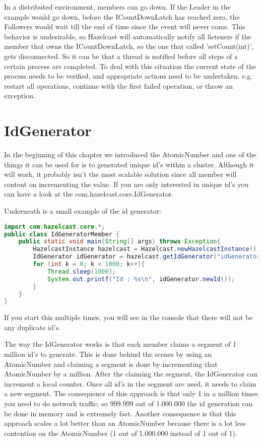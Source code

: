 In a distributed environment, members can go down. If the Leader in the example would go down, before the ICountDownLatch has reached zero, the Followers would wait till the end of time since the event will never come. This behavior is undesirable, so Hazelcast will automatically notify all listeners if the member that owns the ICountDownLatch, so the one that called 'setCount(int)', gets disconnected. So it can be that a thread is notified before all steps of a certain process are completed. To deal with this situation the current state of the process needs to be verified, and appropriate actions need to be undertaken. e.g. restart all operations, continue with the first failed operation, or throw an exception.

\section{IdGenerator}
In the beginning of this chapter we introduced the AtomicNumber and one of the things it can be used for is to generated unique id's within a cluster. Although it will work, it probably isn't the most scalable solution since all member will content on incrementing the value. If you are only interested in unique id's you can have a look at the com.hazelcast.core.IdGenerator.

Underneath is a small example of the id generator:
\begin{lstlisting}[language=java]
import com.hazelcast.core.*;
public class IdGeneratorMember {
    public static void main(String[] args) throws Exception{
        HazelcastInstance hazelcast = Hazelcast.newHazelcastInstance();
        IdGenerator idGenerator = hazelcast.getIdGenerator("idGenerator");
        for (int k = 0; k < 1000; k++){
            Thread.sleep(1000);
            System.out.printf("Id : %s\n", idGenerator.newId());
        }
    }
}
\end{lstlisting}
If you start this multiple times, you will see in the console that there will not be any duplicate id's.

The way the IdGenerator works is that each member claims a segment of 1 million id's to generate. This is done behind the scenes by using an AtomicNumber and claiming a segment is done by incrementing that AtomicNumber by a million. After the claiming the segment, the IdGenerator can increment a local counter. Once all id's in the segment are used, it needs to claim a new segment. The consequence of this approach is that only 1 in a million times you need to do network traffic; so 999.999 out of 1.000.000 the id generation can be done in memory and is extremely fast. Another consequence is that this approach scales a lot better than an AtomicNumber because there is a lot less contention on the AtomicNumber (1 out of 1.000.000 instead of 1 out of 1).

